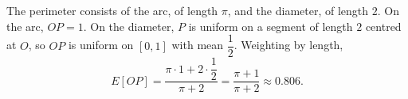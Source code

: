 The perimeter consists of the arc, of length $\pi$, and the diameter, of length $2$. On the arc, $OP=1$. On the diameter, $P$ is uniform on a segment of length $2$ centred at $O$, so $OP$ is uniform on $[0,1]$ with mean $\dfrac12$. Weighting by length,
\[E[OP]=\dfrac{\pi\cdot1+2\cdot\dfrac12}{\pi+2}=\boxed{\dfrac{\pi+1}{\pi+2}}\approx0.806.\]
